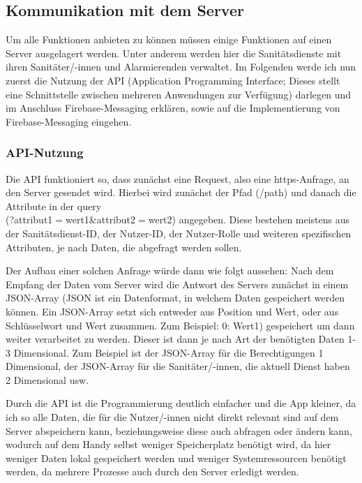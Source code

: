 \subsection{Kommunikation mit dem Server}
Um alle Funktionen anbieten zu können müssen einige Funktionen auf einen Server
ausgelagert werden. Unter anderem werden hier die Sanitätsdienste mit ihren 
Sanitäter/-innen und Alarmierenden verwaltet. Im Folgenden werde ich nun zuerst
die Nutzung der API (Application Programming Interface; Dieses stellt eine Schnittstelle zwischen 
mehreren Anwendungen zur Verfügung) darlegen und im Anschluss Firebase-Messaging erklären, sowie auf
die Implementierung von Firebase-Messaging eingehen.
\subsubsection{API-Nutzung}
Die API funktioniert so, dass zunächst eine Request, also eine https-Anfrage,
an den Server gesendet wird. Hierbei wird zunächst der Pfad (/path) und 
danach die Attribute in der query \\(?attribut1$=$wert1\&attribut2$=$wert2) 
angegeben. Diese bestehen meistens aus der Sanitätsdienst-ID, der Nutzer-ID, 
der Nutzer-Rolle und weiteren spezifischen Attributen, je nach Daten, die 
abgefragt werden sollen.

Der Aufbau einer solchen Anfrage würde dann wie folgt aussehen: 
Nach dem Empfang der Daten vom Server wird die Antwort des Servers zunächst 
in einem JSON-Array (JSON ist ein Datenformat, in welchem Daten gespeichert werden können.
Ein JSON-Array setzt sich entweder aus Position und Wert, oder aus Schlüsselwort und Wert zusammen.
Zum Beispiel: 0: Wert1) gespeichert um dann weiter verarbeitet zu werden. Dieser ist
dann je nach Art der benötigten Daten 1-3 Dimensional. Zum Beispiel ist der 
JSON-Array für die Berechtigungen 1 Dimensional, der JSON-Array für die 
Sanitäter/-innen, die aktuell Dienst haben 2 Dimensional usw.

Durch die API ist die Programmierung deutlich einfacher und die App kleiner, da
ich so alle Daten, die für die Nutzer/-innen nicht direkt relevant sind auf dem 
Server abspeichern kann, beziehungsweise diese auch abfragen oder ändern kann,
wodurch auf dem Handy selbst weniger Speicherplatz benötigt wird, da hier weniger 
Daten lokal gespeichert werden und weniger Systemressourcen benötigt werden, da
mehrere Prozesse auch durch den Server erledigt werden.



